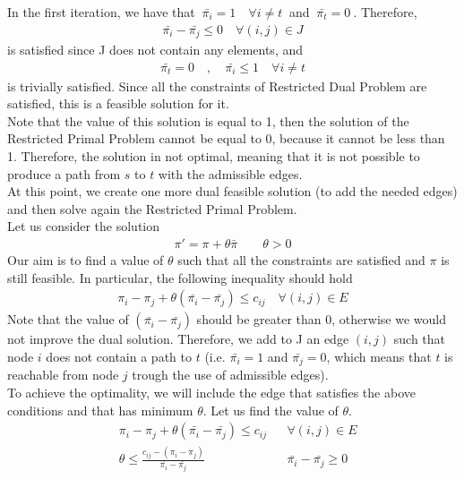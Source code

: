 \documentclass[a4paper,11pt]{article}
\begin{document}
In the first iteration, we have that $\ \bar{\pi_i} = 1 \quad \forall i \ne t \ $  and $\ \bar{\pi_t} = 0 \ $. Therefore,
\begin{align*}
	\bar{\pi_i} - \bar{\pi_j} \le 0 \quad \forall (i,j) \in J 
\end{align*}
is satisfied since J does not contain any elements, and
\begin{align*}
	\bar{\pi_t} = 0 \quad , \quad \bar{\pi_i} \le 1 \quad \forall i \ne t
\end{align*}
is trivially satisfied. Since all the constraints of Restricted Dual Problem are satisfied, this is a feasible solution for it.\\ 
Note that the value of this solution is equal to 1, then the solution of the Restricted Primal Problem cannot be equal to 0, because it cannot be less than 1. Therefore, the solution in not optimal, meaning that it is not possible to produce a path from $s$ to $t$ with the admissible edges.\\
At this point, we create one more dual feasible solution (to add the needed edges) and then solve again the Restricted Primal Problem.\\
Let us consider the solution
\begin{align*}
	\pi' = \pi + \theta \bar{\pi} \qquad \theta > 0
\end{align*}
Our aim is to find a value of $\theta$ such that all the constraints are satisfied and $\pi$ is still feasible. In particular, the following inequality should hold
\begin{align*}
	\pi_i - \pi_j + \theta (\bar{\pi_i} - \bar{\pi_j}) \le c_{ij} \quad \forall (i,j) \in E
\end{align*}
Note that the value of $(\bar{\pi_i} - \bar{\pi_j}) $ should be greater than 0, otherwise we would not improve the dual solution. Therefore, we add to J an edge $(i,j)$ such that node $i$ does not contain a path to $t$ (i.e. $\bar{\pi_i} = 1$ and $\bar{\pi_j} =0$, which means that $t$ is reachable from node $j$ trough the use of admissible edges). \\
To achieve the optimality, we will include the edge that satisfies the above conditions and that has minimum $\theta$.
Let us find the value of $\theta$.
\begin{align*}
	&\pi_i - \pi_j + \theta (\bar{\pi_i} - \bar{\pi_j}) \le c_{ij} & &\forall (i,j) \in E\\
	&\theta \le \frac{c_{ij} - (\pi_i - \pi_j)} {\bar{\pi_i} - \bar{\pi_j}} & &\bar{\pi_i} - \bar{\pi_j} \ge 0
\end{align*}
\end{document}
